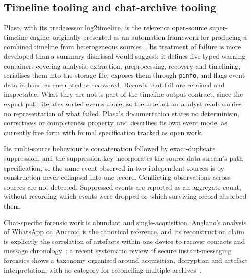 \subsection{Timeline tooling and chat-archive tooling}
\label{sec:related:tooling}

Plaso, with its predecessor log2timeline, is the reference open-source
super-timeline engine, originally presented as an automation framework for
producing a combined timeline from heterogeneous
sources~\citep{gudjonsson2010log2timeline}. Its treatment of failure is more
developed than a summary dismissal would suggest: it defines five typed warning
containers covering analysis, extraction, preprocessing, recovery and timelining,
serialises them into the storage file, exposes them through \texttt{pinfo}, and
flags event data in-band as corrupted or recovered. Records that fail are retained
and inspectable. What they are not is part of the timeline output contract, since
the export path iterates sorted events alone, so the artefact an analyst reads
carries no representation of what failed. Plaso's documentation states no
determinism, correctness or completeness property, and describes its own event
model as currently free form with formal specification tracked as open work.

Its multi-source behaviour is concatenation followed by exact-duplicate
suppression, and the suppression key incorporates the source data stream's path
specification, so the same event observed in two independent sources is by
construction never collapsed into one record. Conflicting observations across
sources are not detected. Suppressed events are reported as an aggregate count,
without recording which events were dropped or which surviving record absorbed
them.

Chat-specific forensic work is abundant and single-acquisition. Anglano's analysis
of WhatsApp on Android is the canonical reference, and its reconstruction claim is
explicitly the correlation of artefacts within one device to recover contacts and
message chronology~\citep{anglano2014whatsapp}; a recent systematic review of
secure instant-messaging forensics shows a taxonomy organised around acquisition,
decryption and artefact interpretation, with no category for reconciling multiple
archives~\citep{onik2025slr}.

